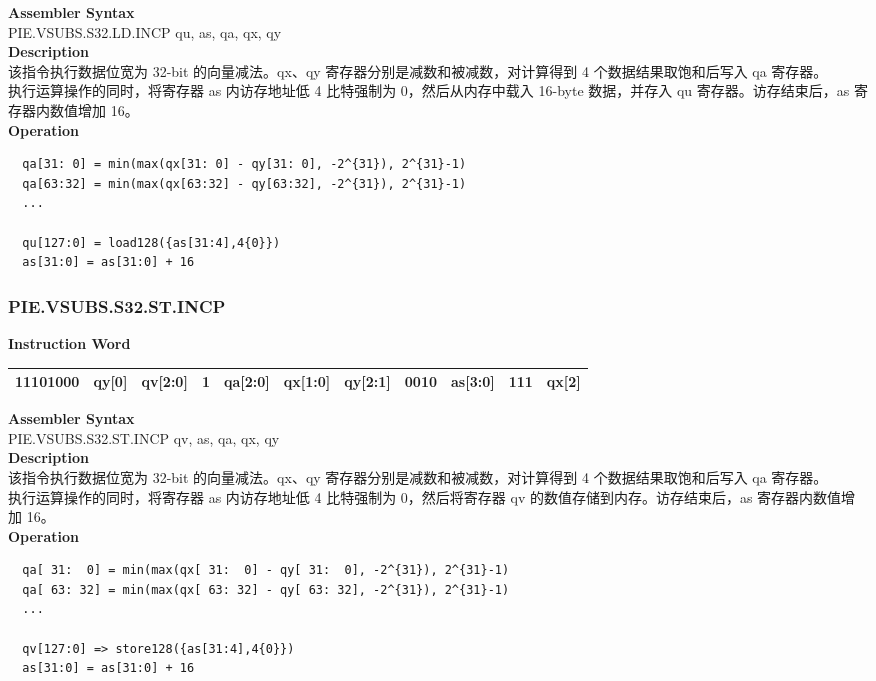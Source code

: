 \textbf{Assembler Syntax} \\
PIE.VSUBS.S32.LD.INCP qu, as, qa, qx, qy \\
\textbf{Description} \\
该指令执行数据位宽为 32-bit 的向量减法。qx、qy 寄存器分别是减数和被减数，对计算得到 4 个数据结果取饱和后写入 qa 寄存器。\\ 执行运算操作的同时，将寄存器 as 内访存地址低 4 比特强制为 0，然后从内存中载入 16-byte 数据，并存入 qu 寄存器。访存结束后，as 寄存器内数值增加 16。\\
\textbf{Operation}
\begin{lstlisting}
  qa[31: 0] = min(max(qx[31: 0] - qy[31: 0], -2^{31}), 2^{31}-1)
  qa[63:32] = min(max(qx[63:32] - qy[63:32], -2^{31}), 2^{31}-1)
  ...

  qu[127:0] = load128({as[31:4],4{0}})
  as[31:0] = as[31:0] + 16
\end{lstlisting}

\newpage
\subsubsection{PIE.VSUBS.S32.ST.INCP}\label{instruction:PIEVSUBSS32STINCP}
\setlength\tabcolsep{6pt}
\textbf{Instruction Word} \\
\begin{tabular}{|c|c|c|c|c|c|c|c|c|c|c|}
	\hline
	11101000 & qy[0] & qv[2:0] & 1 & qa[2:0] & qx[1:0] & qy[2:1] & 0010 & as[3:0] & 111 & qx[2] \\
	\hline
\end{tabular}

\textbf{Assembler Syntax} \\
PIE.VSUBS.S32.ST.INCP qv, as, qa, qx, qy \\
\textbf{Description} \\
该指令执行数据位宽为 32-bit 的向量减法。qx、qy 寄存器分别是减数和被减数，对计算得到 4 个数据结果取饱和后写入 qa 寄存器。\\ 执行运算操作的同时，将寄存器 as 内访存地址低 4 比特强制为 0，然后将寄存器 qv 的数值存储到内存。访存结束后，as 寄存器内数值增加 16。\\
\textbf{Operation}
\begin{lstlisting}
  qa[ 31:  0] = min(max(qx[ 31:  0] - qy[ 31:  0], -2^{31}), 2^{31}-1)
  qa[ 63: 32] = min(max(qx[ 63: 32] - qy[ 63: 32], -2^{31}), 2^{31}-1)
  ...

  qv[127:0] => store128({as[31:4],4{0}})
  as[31:0] = as[31:0] + 16
\end{lstlisting}

